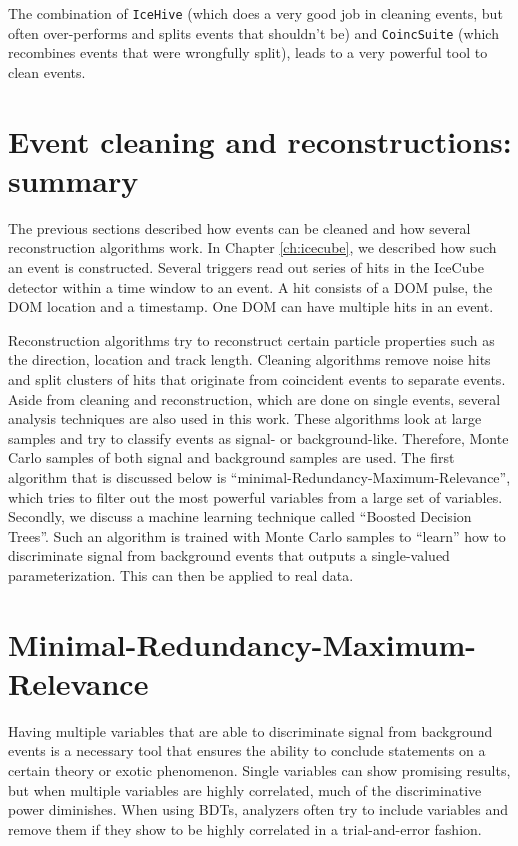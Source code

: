 \vspace{2mm}
\noindent The combination of \texttt{IceHive} (which does a very good job in cleaning events, but often over-performs and splits events that shouldn't be) and \texttt{CoincSuite} (which recombines events that were wrongfully split), leads to a very powerful tool to clean events.


\section{Event cleaning and reconstructions: summary}
The previous sections described how events can be cleaned and how several reconstruction algorithms work. In Chapter \ref{ch:icecube}, we described how such an event is constructed. Several triggers read out series of hits in the IceCube detector within a time window to an event. A hit consists of a DOM pulse, the DOM location and a timestamp. One DOM can have multiple hits in an event.

Reconstruction algorithms try to reconstruct certain particle properties such as the direction, location and track length. Cleaning algorithms remove noise hits and split clusters of hits that originate from coincident events to separate events.\\

\noindent Aside from cleaning and reconstruction, which are done on single events, several analysis techniques are also used in this work. These algorithms look at large samples and try to classify events as signal- or background-like. Therefore, Monte Carlo samples of both signal and background samples are used. The first algorithm that is discussed below is ``minimal-Redundancy-Maximum-Relevance'', which tries to filter out the most powerful variables from a large set of variables. Secondly, we discuss a machine learning technique called ``Boosted Decision Trees''. Such an algorithm is trained with Monte Carlo samples to ``learn'' how to discriminate signal from background events that outputs a single-valued parameterization. This can then be applied to real data.



\section{Minimal-Redundancy-Maximum-Relevance}
\label{sec:mrmr}
Having multiple variables that are able to discriminate signal from background events is a necessary tool that ensures the ability to conclude statements on a certain theory or exotic phenomenon. Single variables can show promising results, but when multiple variables are highly correlated, much of the discriminative power diminishes. When using BDTs, analyzers often try to include variables and remove them if they show to be highly correlated in a trial-and-error fashion.

